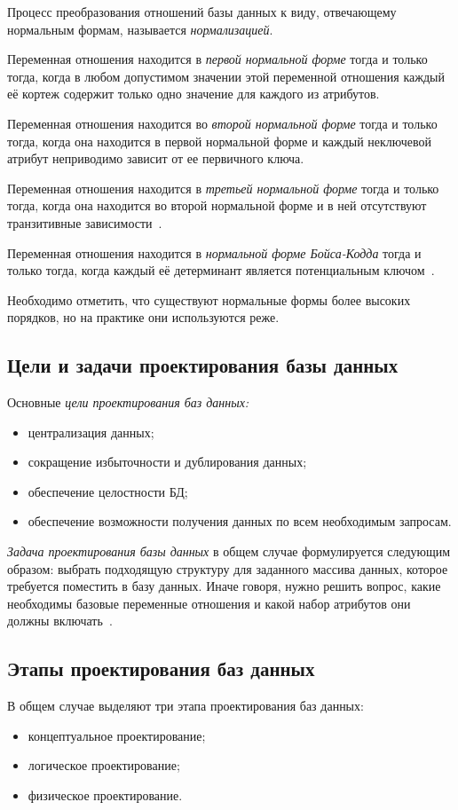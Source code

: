 Процесс преобразования отношений базы данных к виду, отвечающему нормальным формам,
называется \textit{нормализацией}.

Переменная отношения находится в \textit{первой нормальной форме} тогда и только
тогда, когда в любом допустимом значении этой переменной отношения каждый её кортеж
содержит только одно значение для каждого из атрибутов.

Переменная отношения находится во \textit{второй нормальной форме} тогда и только тогда,
когда она находится в первой нормальной форме и каждый неключевой атрибут
неприводимо зависит от ее первичного ключа.

Переменная отношения находится в \textit{третьей нормальной форме} тогда и только
тогда, когда она находится во второй нормальной форме и в ней отсутствуют транзитивные
зависимости~\cite{date05}.

Переменная отношения находится в \textit{нормальной форме Бойса-Кодда} тогда и только тогда,
когда каждый её детерминант является потенциальным ключом~\cite{konnolli03}.

Необходимо отметить, что существуют нормальные формы более высоких порядков, но
на практике они используются реже.

\subsection{Цели и задачи проектирования базы данных}
\label{sub:db_structure_aims}

Основные \textit{цели проектирования баз данных:}
\begin{itemize}
  \item централизация данных;
  \item сокращение избыточности и дублирования данных;
  \item обеспечение целостности БД;
  \item обеспечение возможности получения данных по всем необходимым запросам.
\end{itemize}

\textit{Задача проектирования базы данных} в общем случае формулируется следующим образом: выбрать
подходящую структуру для заданного массива данных, которое требуется поместить в базу данных.
Иначе говоря, нужно решить вопрос, какие необходимы базовые переменные отношения и какой
набор атрибутов они должны включать~\cite{date05}.

\subsection{Этапы проектирования баз данных}
\label{sub:db_structure_stages}
В общем случае выделяют три этапа проектирования баз данных:
\begin{itemize}
  \item концептуальное проектирование;
  \item логическое проектирование;
  \item физическое проектирование.
\end{itemize}

